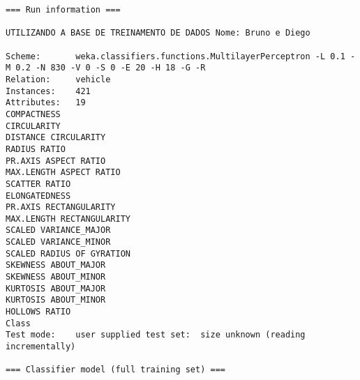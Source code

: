 \documentclass[
	article,			%
	11pt,				%
	oneside,			%
	a4paper,			%
	english,			%
	brazil,				%
	sumario=tradicional
	]{abntex2}
\begin{document}
\begin{lstlisting}
=== Run information ===

UTILIZANDO A BASE DE TREINAMENTO DE DADOS Nome: Bruno e Diego

Scheme:       weka.classifiers.functions.MultilayerPerceptron -L 0.1 -M 0.2 -N 830 -V 0 -S 0 -E 20 -H 18 -G -R
Relation:     vehicle
Instances:    421
Attributes:   19
COMPACTNESS
CIRCULARITY
DISTANCE CIRCULARITY
RADIUS RATIO
PR.AXIS ASPECT RATIO
MAX.LENGTH ASPECT RATIO
SCATTER RATIO
ELONGATEDNESS
PR.AXIS RECTANGULARITY
MAX.LENGTH RECTANGULARITY
SCALED VARIANCE_MAJOR
SCALED VARIANCE_MINOR
SCALED RADIUS OF GYRATION
SKEWNESS ABOUT_MAJOR
SKEWNESS ABOUT_MINOR
KURTOSIS ABOUT_MAJOR
KURTOSIS ABOUT_MINOR
HOLLOWS RATIO
Class
Test mode:    user supplied test set:  size unknown (reading incrementally)

=== Classifier model (full training set) ===


\end{lstlisting}
\end{document}
